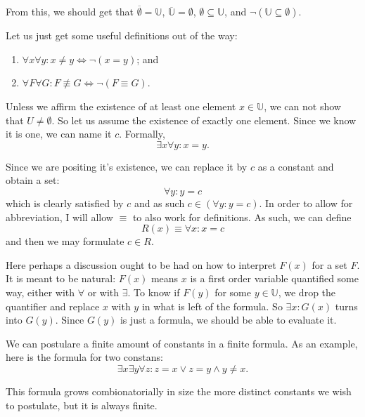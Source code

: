 \documentclass[11pt]{article}
\theoremstyle{plain}
\theoremstyle{nonumberplain}
\newcommand{\wee}{\wedge}
\newcommand{\U}{\mathbb{U}}
\newcommand{\negset}[1]{\overline{#1}}
\newcommand{\nequiv}{\not\equiv}
\begin{document}
From this, we should get that $\negset{\emptyset} = \mathbb{U}$, $\negset{\U} = \emptyset$, $\emptyset \subseteq \U$, and $\neg (\U \subseteq \emptyset)$.

Let us just get some useful definitions out of the way: \begin{enumerate}
    \item $\forall x \forall y : x \neq y \iff \neg (x = y)$; and
    \item $\forall F \forall G : F \nequiv G \iff \neg (F \equiv G)$.
\end{enumerate}

Unless we affirm the existence of at least one element $x \in \U$, we can not show that $U \neq \emptyset$. So let us assume the existence of exactly one element. Since we know it is one, we can name it $c$. Formally, \begin{equation}
    \exists x \forall y : x = y.
\end{equation}

Since we are positing it's existence, we can replace it by $c$ as a constant and obtain a set: \begin{equation}
    \forall y : y = c
\end{equation}
which is clearly satisfied by $c$ and as such $c \in (\forall y : y = c)$. In order to allow for abbreviation, I will allow $\equiv$ to also work for definitions. As such, we can define \begin{equation}
    R(x) \equiv \forall x : x = c
\end{equation}
and then we may formulate $c \in R$.

Here perhaps a discussion ought to be had on how to interpret $F(x)$ for a set $F$. It is meant to be natural: $F(x)$ means $x$ is a first order variable quantified some way, either with $\forall$ or with $\exists$. To know if $F(y)$ for some $y \in \U$, we drop the quantifier and replace $x$ with $y$ in what is left of the formula. So $\exists x : G(x)$ turns into $G(y)$. Since $G(y)$ is just a formula, we should be able to evaluate it.

We can postulare a finite amount of constants in a finite formula. As an example, here is the formula for two constans: \begin{equation}
    \exists x \exists y \forall z : z = x \vee z = y \wee y \neq x.
\end{equation}

This formula grows combionatorially in size the more distinct constants we wish to postulate, but it is always finite.
\end{document}
